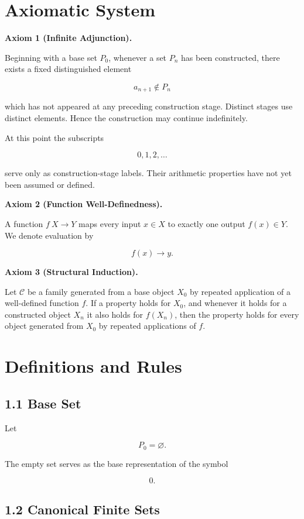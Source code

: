 \documentclass[12pt]{article}
\begin{document}
\section*{Axiomatic System}

\textbf{Axiom 1 (Infinite Adjunction).}

Beginning with a base set \(P_0\), whenever a set \(P_n\) has been constructed, there exists a fixed distinguished element

\[
a_{n+1}\notin P_n
\]

which has not appeared at any preceding construction stage. Distinct stages use distinct elements. Hence the construction may continue indefinitely.

At this point the subscripts

\[
0,1,2,\ldots
\]

serve only as construction-stage labels. Their arithmetic properties have not yet been assumed or defined.

\textbf{Axiom 2 (Function Well-Definedness).}

A function \(f\:X\to Y\) maps every input \(x\in X\) to exactly one output \(f(x)\in Y\). We denote evaluation by

\[
f(x)\to y.
\]

\textbf{Axiom 3 (Structural Induction).}

Let \(\mathcal C\) be a family generated from a base object \(X_0\) by repeated application of a well-defined function \(f\). If a property holds for \(X_0\), and whenever it holds for a constructed object \(X_n\) it also holds for \(f(X_n)\), then the property holds for every object generated from \(X_0\) by repeated applications of \(f\).

\section*{Definitions and Rules}

\subsection*{1.1 Base Set}

Let

\[
P_0=\varnothing.
\]

The empty set serves as the base representation of the symbol

\[
0.
\]

\subsection*{1.2 Canonical Finite Sets}
\end{document}
